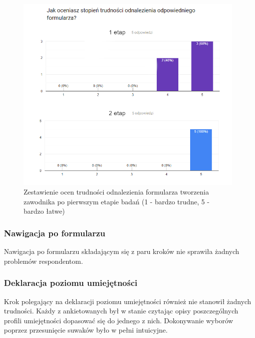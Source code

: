 \begin{figure}[H]
\centering
\includegraphics[width=0.8\linewidth]{07-walidacja/rys/survey-create-player.png}
\caption{Zestawienie ocen trudności odnalezienia formularza tworzenia zawodnika po pierwszym etapie badań (1 - bardzo trudne, 5 - bardzo łatwe)}
\label{fig:view-player-skill}
\end{figure}


\subsubsection{Nawigacja po formularzu}

Nawigacja po formularzu składającym się z paru kroków nie sprawiła żadnych problemów respondentom.

\subsubsection{Deklaracja poziomu umiejętności}

Krok polegający na deklaracji poziomu umiejętności również nie stanowił żadnych trudności. Każdy z ankietowanych był w stanie czytając opisy poszczególnych profili umiejętności dopasować się do jednego z nich. Dokonywanie wyborów poprzez przesunięcie suwaków było w pełni intuicyjne.
  

